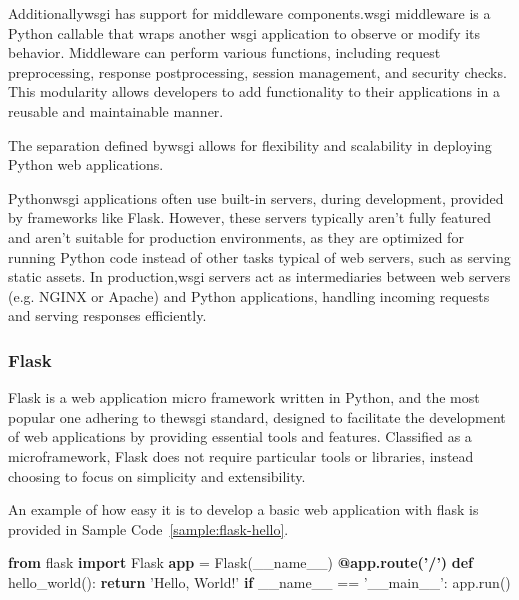    Additionally\ac{wsgi} has support for middleware components.\ac{wsgi} middleware is a Python callable that wraps another
    \ac{wsgi} application to observe or modify its behavior. Middleware can perform various functions, including request 
    preprocessing, response postprocessing, session management, and security checks. This modularity allows developers to 
    add functionality to their applications in a reusable and maintainable manner.

    The separation defined by\ac{wsgi} allows for flexibility and scalability in deploying Python web applications.

    Python\ac{wsgi} applications often use built-in servers, during development, provided by frameworks like Flask. 
    However, these servers typically aren't fully featured and aren't suitable for production environments, as they are optimized 
    for running Python code instead of other tasks typical of web servers, such as serving static assets.  In production,\ac{wsgi} 
    servers act as intermediaries between web servers (e.g. NGINX or Apache) and Python applications, handling incoming requests 
    and serving responses efficiently.

    \subsubsection{Flask}
      Flask is a web application micro framework written in Python, and the most popular one adhering to the\ac{wsgi} standard, designed to 
      facilitate the development of web applications by providing essential tools and features. Classified as a microframework, 
      Flask does not require particular tools or libraries, instead choosing to focus on simplicity and extensibility\cite{flask2025}.

      An example of how easy it is to develop a basic web application with flask is provided in Sample Code~\ref{sample:flask-hello}.

      \begin{algorithm}
        \caption{Flask Hello World}\label{flask-hello-world}
        \begin{algorithmic}[1]
          \State \textbf{from} flask \textbf{import} Flask
          \State \textbf{app} = Flask(\_\_name\_\_)
          \State
          \State \textbf{@app.route('/')}
          \State \textbf{def} hello\_world():
          \State \hspace{1em} \textbf{return} 'Hello, World!'
          \State
          \State \textbf{if} \_\_name\_\_ == '\_\_main\_\_':
          \State \hspace{1em} app.run()
        \end{algorithmic}
        \label{sample:flask-hello}
      \end{algorithm}

